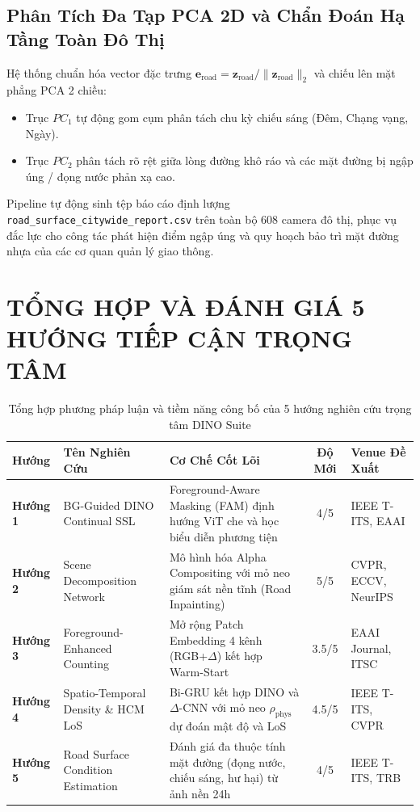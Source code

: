\documentclass[11pt,a4paper]{article}
\begin{document}
\subsection{Phân Tích Đa Tạp PCA 2D và Chẩn Đoán Hạ Tầng Toàn Đô Thị}
Hệ thống chuẩn hóa vector đặc trưng $\mathbf{e}_{\text{road}} = \mathbf{z}_{\text{road}} / \|\mathbf{z}_{\text{road}}\|_2$ và chiếu lên mặt phẳng PCA 2 chiều:
\begin{itemize}
    \item Trục $PC_1$ tự động gom cụm phân tách chu kỳ chiếu sáng (Đêm, Chạng vạng, Ngày).
    \item Trục $PC_2$ phân tách rõ rệt giữa lòng đường khô ráo và các mặt đường bị ngập úng / đọng nước phản xạ cao.
\end{itemize}
Pipeline tự động sinh tệp báo cáo định lượng \texttt{road\_surface\_citywide\_report.csv} trên toàn bộ 608 camera đô thị, phục vụ đắc lực cho công tác phát hiện điểm ngập úng và quy hoạch bảo trì mặt đường nhựa của các cơ quan quản lý giao thông.

\section{TỔNG HỢP VÀ ĐÁNH GIÁ 5 HƯỚNG TIẾP CẬN TRỌNG TÂM}

\begin{table}[htbp]
\centering
\small
\caption{Tổng hợp phương pháp luận và tiềm năng công bố của 5 hướng nghiên cứu trọng tâm DINO Suite}
\label{tab:comparison}
\begin{tabular}{p{1.6cm} p{3.2cm} p{4.6cm} c p{2.8cm}}
\toprule
\textbf{Hướng} & \textbf{Tên Nghiên Cứu} & \textbf{Cơ Chế Cốt Lõi} & \textbf{Độ Mới} & \textbf{Venue Đề Xuất} \\
\midrule
\textbf{Hướng 1} & BG-Guided DINO Continual SSL & Foreground-Aware Masking (FAM) định hướng ViT che và học biểu diễn phương tiện & 4/5 & IEEE T-ITS, EAAI \\
\addlinespace
\textbf{Hướng 2} & Scene Decomposition Network & Mô hình hóa Alpha Compositing với mỏ neo giám sát nền tĩnh (Road Inpainting) & 5/5 & CVPR, ECCV, NeurIPS \\
\addlinespace
\textbf{Hướng 3} & Foreground-Enhanced Counting & Mở rộng Patch Embedding 4 kênh (RGB+$\Delta$) kết hợp Warm-Start & 3.5/5 & EAAI Journal, ITSC \\
\addlinespace
\textbf{Hướng 4} & Spatio-Temporal Density \& HCM LoS & Bi-GRU kết hợp DINO và $\Delta$-CNN với mỏ neo $\rho_{\text{phys}}$ dự đoán mật độ và LoS & 4.5/5 & IEEE T-ITS, CVPR \\
\addlinespace
\textbf{Hướng 5} & Road Surface Condition Estimation & Đánh giá đa thuộc tính mặt đường (đọng nước, chiếu sáng, hư hại) từ ảnh nền 24h & 4/5 & IEEE T-ITS, TRB \\
\bottomrule
\end{tabular}
\end{table}
\end{document}
